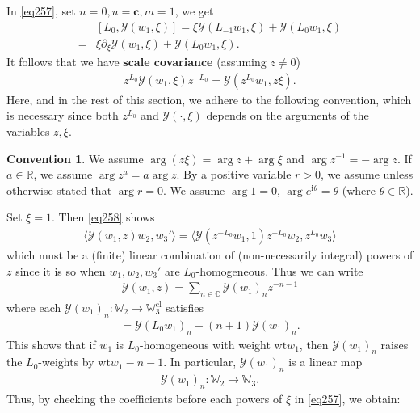 \documentclass[11pt,b5paper,notitlepage]{article}
\theoremstyle{definition}
\newtheorem{cv}[df]{Convention}
\theoremstyle{plain}
\newcommand{\mc}{\mathcal}
\newcommand{\bk}[1]{\langle {#1}\rangle}
\newcommand{\im}{\mathbf{i}}
\newcommand{\Wbb}{\mathbb W}
\newcommand{\Cbb}{\mathbb C}
\newcommand{\Rbb}{\mathbb R}
\newcommand{\cbf}{\mathbf c}
\newcommand{\wt}{\mathrm{wt}}
\newcommand{\cl}{\mathrm{cl}}
\numberwithin{equation}{section}
\begin{document}
In \eqref{eq257}, set $n=0,u=\cbf,m=1$, we get
\begin{align*}
&[L_0,\mc Y(w_1,\xi)]=\xi\mc Y(L_{-1}w_1,\xi)+\mc Y(L_0w_1,\xi)\\
=&\xi\partial_\xi \mc Y(w_1,\xi)+\mc Y(L_0w_1,\xi).
\end{align*}
It follows that we have \textbf{scale covariance} (assuming $ z\neq 0$)
\begin{align}
 z^{L_0}\mc Y(w_1,\xi) z^{-L_0}=\mc Y( z^{L_0}w_1, z\xi).\label{eq258}
\end{align}
Here, and in the rest of this section, we adhere to the following convention, which is necessary since both $ z^{L_0}$ and $\mc Y(\cdot,\xi)$ depends on the arguments of the variables $ z,\xi$.
\begin{cv}\label{lb183}
We assume $\arg( z\xi)=\arg z+\arg\xi$ and $\arg z^{-1}=-\arg z$. If $a\in\Rbb$, we assume $\arg z^a=a\arg z$. By a positive variable $r>0$, we assume unless otherwise stated that $\arg r=0$. We assume $\arg 1=0$, $\arg e^{\im\theta}=\theta$ (where $\theta\in\Rbb$).
\end{cv}
Set $\xi=1$. Then \eqref{eq258} shows
\begin{align}
\bk{\mc Y(w_1,z)w_2,w_3'}=\bk{\mc Y(z^{-L_0}w_1,1)z^{-L_0}w_2,z^{L_0}w_3}
\end{align}
which must be a (finite) linear combination of (non-necessarily integral) powers of $z$ since it is so when $w_1,w_2,w_3'$ are $L_0$-homogeneous. Thus we can write
\begin{align*}
\mc Y(w_1,z)=\sum_{n\in\Cbb}\mc Y(w_1)_nz^{-n-1}
\end{align*}
where each $\mc Y(w_1)_n:\Wbb_2\rightarrow\Wbb_3^\cl$ satisfies
\begin{align}
[L_0,\mc Y(w_1)_n]=\mc Y(L_0w_1)_n-(n+1)\mc Y(w_1)_n.
\end{align}
This shows that if $w_1$ is $L_0$-homogeneous with weight $\wt w_1$, then $\mc Y(w_1)_n$ raises the $L_0$-weights by $\wt w_1-n-1$. In particular, $\mc Y(w_1)_n$ is a linear map
\begin{align*}
\mc Y(w_1)_n:\Wbb_2\rightarrow\Wbb_3.
\end{align*}
Thus, by checking the coefficients before each powers of $\xi$ in \eqref{eq257}, we obtain:
\end{document}

